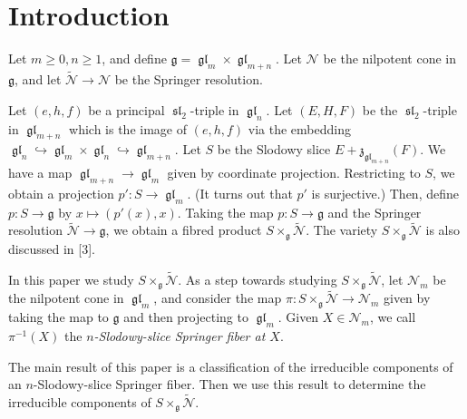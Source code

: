 \documentclass[12pt,psamsfonts]{article}
\DeclareMathOperator{\gl}{\mathfrak{gl}}
\DeclareMathOperator{\spl}{\mathfrak{sl}}
\begin{document}
\section{Introduction}
Let \(m \geq 0, n \geq 1\), and define \(\mathfrak{g} = \gl_m \times \gl_{m + n}\).
Let \(\mathcal{N}\) be the nilpotent cone in \(\mathfrak{g}\), and let \(\widetilde{\mathcal{N}} \to \mathcal{N}\) be the Springer resolution.
\par Let \((e, h, f)\) be a principal \(\spl_2\)-triple in \(\gl_n\).
Let \((E, H, F)\) be the \(\spl_2\)-triple in \(\gl_{m + n}\) which is the image of \((e, h, f)\) via the embedding \(\gl_n \hookrightarrow \gl_m \times \gl_n \hookrightarrow \gl_{m + n}\).
Let \(S\) be the Slodowy slice \(E + \mathfrak{z}_{\gl_{m + n}}(F)\).
We have a map \(\gl_{m + n} \to \gl_m\) given by coordinate projection.
Restricting to \(S\), we obtain a projection \(p' : S \to \gl_m\).
(It turns out that \(p'\) is surjective.)
Then, define \(p : S \to \mathfrak{g}\) by \(x \mapsto (p'(x), x)\).
Taking the map \(p : S \to \mathfrak{g}\) and the Springer resolution \(\widetilde{\mathcal{N}} \to \mathfrak{g}\), we obtain a fibred product \(S \times_\mathfrak{g} \widetilde{\mathcal{N}}\).
The variety \(S \times_\mathfrak{g} \widetilde{\mathcal{N}}\) is also discussed in \cite{sxn}[3].
\par In this paper we study \(S \times_\mathfrak{g} \widetilde{\mathcal{N}}\).
As a step towards studying \(S \times_\mathfrak{g} \widetilde{\mathcal{N}}\), let \(\mathcal{N}_m\) be the nilpotent cone in \(\gl_m\), and consider the map \(\pi : S \times_\mathfrak{g} \widetilde{\mathcal{N}} \to \mathcal{N}_m\) given by taking the map to \(\mathfrak{g}\) and then projecting to \(\gl_m\).
Given \(X \in \mathcal{N}_m\), we call \(\pi^{-1}(X)\) the \emph{\(n\)-Slodowy-slice Springer fiber at \(X\)}.
\par The main result of this paper is a classification of the irreducible components of an \(n\)-Slodowy-slice Springer fiber.
Then we use this result to determine the irreducible components of \(S \times_\mathfrak{g} \widetilde{\mathcal{N}}\).
\end{document}
